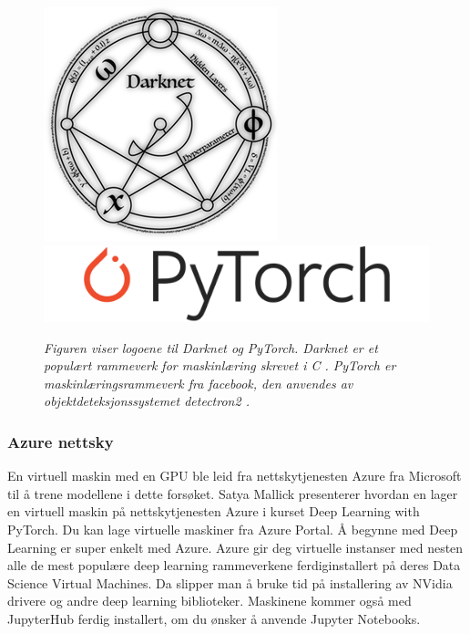 \begin{figure}[t]
\begin{center} 
\includegraphics[scale=0.30]{figures/darknet-logo}
\includegraphics[scale=0.30]{figures/Pytorch_logo}
\caption{\small \sl Figuren viser logoene til Darknet og PyTorch. Darknet er et populært rammeverk for maskinlæring skrevet i C \cite{Redmon 2016}. PyTorch er maskinlæringsrammeverk fra facebook, den anvendes av objektdeteksjonssystemet detectron2 \cite{Wu m.fl. 2020}. \label{fig:dl_libs}}
\end{center} 
\end{figure} 

\subsubsection{Azure nettsky}

En virtuell maskin med en GPU ble leid fra nettskytjenesten Azure fra Microsoft til å trene modellene i dette forsøket. Satya Mallick presenterer hvordan en lager en virtuell maskin på nettskytjenesten Azure i kurset Deep Learning with PyTorch. Du kan lage virtuelle maskiner fra Azure Portal. Å begynne med Deep Learning er super enkelt med Azure. Azure gir deg virtuelle instanser med nesten alle de mest populære deep learning rammeverkene ferdiginstallert på deres Data Science Virtual Machines. Da slipper man å bruke tid på installering av NVidia drivere og andre deep learning biblioteker. Maskinene kommer også med JupyterHub ferdig installert, om du ønsker å anvende Jupyter Notebooks. \cite{Mallick m.fl. 2020}


